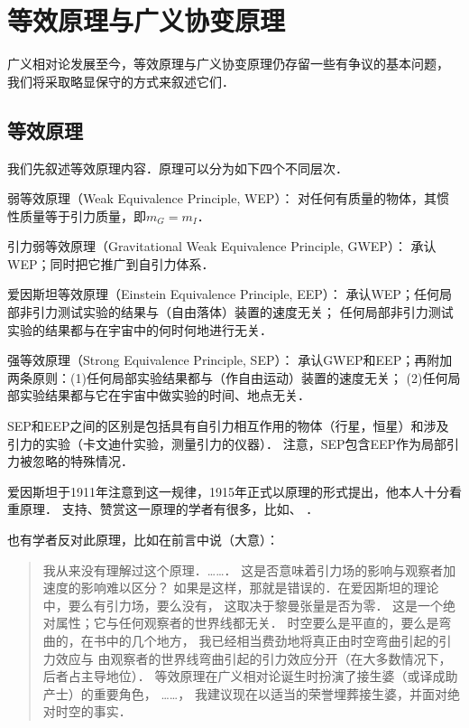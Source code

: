 \section{等效原理与广义协变原理}
广义相对论发展至今，等效原理与广义协变原理仍存留一些有争议的基本问题，
我们将采取略显保守的方式来叙述它们．

\subsection{等效原理}

我们先叙述等效原理内容\cite[Ch.2,Ch.3]{will_tegp-2018}．原理可以分为如下四个不同层次．

{\heiti 弱等效原理（Weak Equivalence Principle, WEP）}：
对任何有质量的物体，其惯性质量等于引力质量，即$m_G=m_I$．

{\heiti 引力弱等效原理（Gravitational Weak Equivalence Principle, GWEP）}：
承认WEP；同时把它推广到自引力体系．


{\heiti 爱因斯坦等效原理（Einstein Equivalence Principle, EEP）}：
承认WEP；任何局部非引力测试实验的结果与（自由落体）装置的速度无关；
任何局部非引力测试实验的结果都与在宇宙中的何时何地进行无关．



{\heiti 强等效原理（Strong Equivalence Principle, SEP）}：
承认GWEP和EEP；再附加两条原则：(1)任何局部实验结果都与（作自由运动）装置的速度无关；
(2)任何局部实验结果都与它在宇宙中做实验的时间、地点无关．

SEP和EEP之间的区别是包括具有自引力相互作用的物体（行星，恒星）和涉及
引力的实验（卡文迪什实验，测量引力的仪器）．
注意，SEP包含EEP作为局部引力被忽略的特殊情况．

爱因斯坦于1911年注意到这一规律，1915年正式以原理的形式提出，他本人十分看重原理．
支持、赞赏这一原理的学者有很多，比如\parencite[Ch.16]{mtw1973}、
\parencite[Ch.2]{will_tegp-2018}．

也有学者反对此原理，比如\textcite{synge-1960}在前言中说（大意）：
\begin{quotation}
    {\fangsong
        我从来没有理解过这个原理．……．
        这是否意味着引力场的影响与观察者加速度的影响难以区分？
        如果是这样，那就是错误的．在爱因斯坦的理论中，要么有引力场，要么没有，
        这取决于黎曼张量是否为零．
        这是一个绝对属性；它与任何观察者的世界线都无关．
        时空要么是平直的，要么是弯曲的，在书中的几个地方，
        我已经相当费劲地将真正由时空弯曲引起的引力效应与
        由观察者的世界线弯曲引起的引力效应分开（在大多数情况下，后者占主导地位）．
        等效原理在广义相对论诞生时扮演了接生婆（或译成助产士）的重要角色，
        ……，
        我建议现在以适当的荣誉埋葬接生婆，并面对绝对时空的事实．
    }
\end{quotation}

